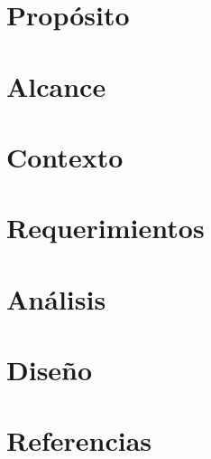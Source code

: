 \documentclass[11pt]{article}
\begin{document}


\newpage



\newpage


\tableofcontents
\newpage
        

\section{Propósito}



\section{Alcance}



\section{Contexto}

 

\section{Requerimientos}



\section{Análisis}



\section{Diseño}



\section{Referencias}
    

\end{document}
